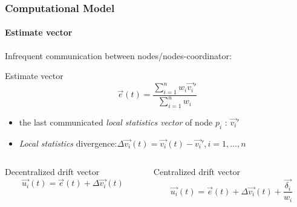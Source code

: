 \documentclass[hyperref={pdfpagelabels=false}]{beamer}
\begin{document}
\begin{frame} \frametitle{Computational Model}\framesubtitle{Estimate vector}
Infrequent communication between nodes/nodes-coordinator:
\begin{block}{Estimate vector}
\begin{equation}
\vec{e}(t)=\frac{\sum_{i=1}^n {w_i \vec{v_i}'}}{\sum_{i=1}^n {w_i}}
\label{form:estimateVector}
\end{equation}
\end{block}
\begin{itemize}
\item the last communicated \emph{local statistics vector} of node $p_i$ : $\vec{v_i}'$
\item \emph{Local statistics} divergence:$\Delta \vec{v_i}(t)=\vec{v_i}(t)-\vec{v_i}', i=1,\dots,n$
\end{itemize}
\begin{columns}
\begin{column}[t]{0.5\textwidth}
\begin{block}{Decentralized drift vector}
\vspace{-0.3cm}
\begin{equation}
\vec{u_i}(t)=\vec{e}(t)+\Delta \vec{v_i}(t)
\label{form:decentralizedDrift}
\end{equation}
\end{block}
\end{column}
\begin{column}[t]{0.5\textwidth}
\begin{block}{Centralized drift vector}
\vspace{-0.45cm}
\begin{equation}
\vec{u_i}(t)=\vec{e}(t)+\Delta \vec{v_i}(t)+\frac{\vec{\delta_i}}{w_i}
\label{form:centralizedDrift}
\end{equation} 
\end{block}
\end{column}
\end{columns}
\end{frame}
\end{document}

